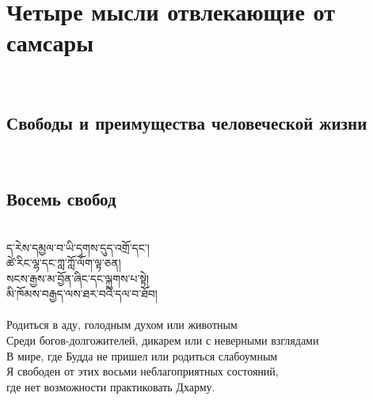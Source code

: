 \newpage
\section{Четыре мысли отвлекающие от самсары}
\\
\subsection{Свободы и преимущества человеческой жизни}
\\
\subsection*{Восемь свобод}
\\
\ti
ད་རེས་དམྱལ་བ་ཡི་དྭགས་དུད་འགྲོ་དང༌།\\
ཚེ་རིང་ལྷ་དང་ཀླ་ཀློ་ལོག་ལྟ་ཅན།\\
སངས་རྒྱས་མ་བྱོན་ཞིང་དང་ལྐུགས་པ་སྟེ།\\
མི་ཁོམས་བརྒྱད་ལས་ཐར་བའི་དལ་བ་ཐོབ།\\
\\
\ru
Родиться в аду, голодным духом или животным\\
Среди богов-долгожителей, дикарем или с неверными взглядами\\
В мире, где Будда не пришел или родиться слабоумным\\
Я свободен от этих восьми неблагоприятных состояний,\\
где нет возможности практиковать Дхарму.\\

\newpage
